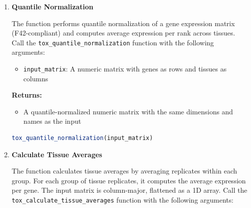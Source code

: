 \documentclass[11pt]{article}
\begin{document}
\begin{enumerate}
\begin{enumerate}
	      	      \begin{itemize}
	      	      	\item \texttt{input\_matrix}: A numeric matrix with genes as rows and
	      	      	      tissues as columns
	      	      \end{itemize}
	      	      
	      	      \textbf{Returns:}
	      	      \begin{itemize}
	      	      	\item A normalized numeric matrix with the same dimensions and names
	      	      	      as the input
	      	      \end{itemize}
	      	      \begin{lstlisting}[language=R, caption={R Standard Deviation Normalization}]
tox_normalize_by_std_dev(input_matrix)
	      	      \end{lstlisting}
	      	      
	      	\item \textbf{Quantile Normalization}
	      	      
	      	      The function performs quantile normalization of a gene expression matrix
	      	      (F42-compliant) and computes average expression per rank across tissues.
	      	      Call the \texttt{tox\_quantile\_normalization} function with the following
	      	      arguments:
	      	      
	      	      \begin{itemize}
	      	      	\item \texttt{input\_matrix}: A numeric matrix with genes as rows and
	      	      	      tissues as columns
	      	      \end{itemize}
	      	      
	      	      \textbf{Returns:}
	      	      \begin{itemize}
	      	      	\item A quantile-normalized numeric matrix with the same dimensions and
	      	      	      names as the input
	      	      \end{itemize}
	      	      \begin{lstlisting}[language=R, caption={R Quantile Normalization}]
tox_quantile_normalization(input_matrix)
	      	      \end{lstlisting}
	      	      
	      	\item \textbf{Calculate Tissue Averages}
	      	      
	      	      The function calculates tissue averages by averaging replicates within
	      	      each group. For each group of tissue replicates, it computes the average
	      	      expression per gene. The input matrix is column-major, flattened as a 1D
	      	      array. Call the \texttt{tox\_calculate\_tissue\_averages} function with
	      	      the following arguments:
	      	      

\end{enumerate}
\end{enumerate}
\end{document}
